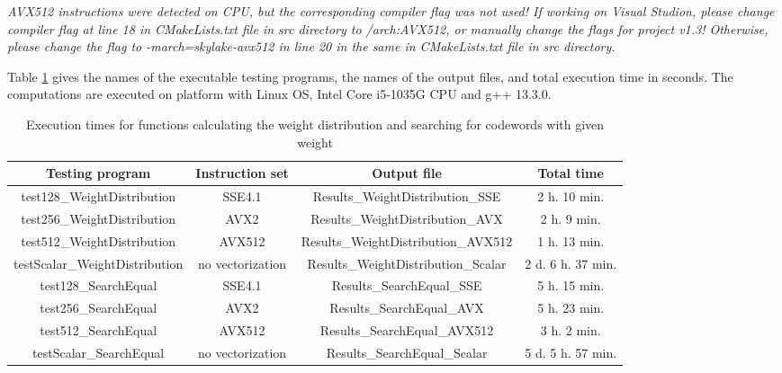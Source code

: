 	
	\emph{AVX512 instructions were detected on CPU, but the corresponding compiler flag was not used! If working on Visual Studion, please change compiler flag at line 18 in CMakeLists.txt file in src directory to /arch:AVX512, or manually change the flags for project v1.3! Otherwise, please change the flag to  -march=skylake-avx512 in line 20 in the same in CMakeLists.txt file in src directory.}
	
	
	Table \ref{ExecTimes} gives the names of the executable testing programs, the names of the output files, and total execution time in seconds. The computations are executed on platform with Linux OS, Intel Core i5-1035G CPU and g++ 13.3.0.
		\begin{table}[h]
		\caption{Execution times for functions calculating the weight distribution and searching for codewords with given weight}
		\label{ExecTimes}
		\begin{center}
			\begin{tabular}{|c|c|c|c|}
				\hline
				Testing program & Instruction set & Output file & Total time\\
				\hline \hline
				test128\_WeightDistribution & SSE4.1 & Results\_WeightDistribution\_SSE & 2 h. 10 min. \\ 
				\hline
				test256\_WeightDistribution & AVX2 & Results\_WeightDistribution\_AVX & 2 h. 9 min. \\
				\hline
				test512\_WeightDistribution & AVX512 & Results\_WeightDistribution\_AVX512 & 1 h. 13 min.  \\
				\hline
				testScalar\_WeightDistribution & no vectorization & Results\_WeightDistribution\_Scalar & 2 d. 6 h. 37 min. \\
				\hline\hline
				test128\_SearchEqual & SSE4.1 & Results\_SearchEqual\_SSE & 5 h. 15 min. \\
				\hline
				test256\_SearchEqual & AVX2 & Results\_SearchEqual\_AVX & 5 h. 23 min.\\
				\hline
				test512\_SearchEqual & AVX512 & Results\_SearchEqual\_AVX512 & 3 h. 2 min. \\
				\hline
				testScalar\_SearchEqual & no vectorization & Results\_SearchEqual\_Scalar & 5 d. 5 h. 57 min. \\
				\hline
			\end{tabular}
		\end{center}
	\end{table}
	
	

